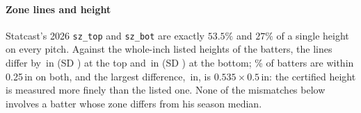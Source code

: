 \documentclass[aoas]{imsart}
\theoremstyle{plain}
\theoremstyle{definition}
\begin{document}
\begin{table}[!htbp]
\caption{Reproduction of the rulings by group, Statcast 2026 coordinates as published and projected a second
time.}\label{tab:bygroup}
\centering\scriptsize

\end{table}

\begin{table}[!htbp]
\caption{Reproduction in the Stats API feeds, whose coordinates are at the front of the plate.}\label{tab:feeds}
\centering\small

\end{table}

\paragraph{Zone lines and height} Statcast's 2026 \texttt{sz\_top} and \texttt{sz\_bot} are exactly $53.5\%$ and $27\%$
of a single height on every pitch. Against the whole-inch listed heights of the \SZoneBatters{} batters, the lines
differ by \SZoneTopMean\,in (SD \SZoneTopSD) at the top and \SZoneBotMean\,in (SD \SZoneBotSD) at the bottom;
\SZoneWithin\% of batters are within 0.25\,in on both, and the largest difference, \SZoneMax\,in, is
$0.535\times0.5$\,in: the certified height is measured more finely than the listed one. None of the mismatches below
involves a batter whose zone differs from his season median.
\end{document}

